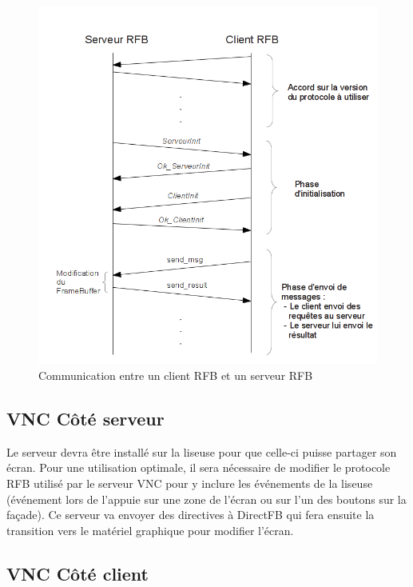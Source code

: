 \begin{figure}[h!]
	\begin{center}
		\includegraphics[scale=0.6]{RFBProtocol.png}
		\caption{Communication entre un client RFB et un serveur RFB}
	\end{center}
\end{figure}

\subsection{VNC Côté serveur}

Le serveur devra être installé sur la liseuse pour que celle-ci puisse partager son écran. Pour une utilisation optimale, il sera nécessaire de modifier le protocole RFB utilisé par le serveur VNC pour y inclure les événements de la liseuse (événement lors de l'appuie sur une zone de l'écran ou sur l'un des boutons sur la façade). Ce serveur va envoyer des directives à DirectFB qui fera ensuite la transition vers le matériel graphique pour modifier l'écran.

\subsection{VNC Côté client}

